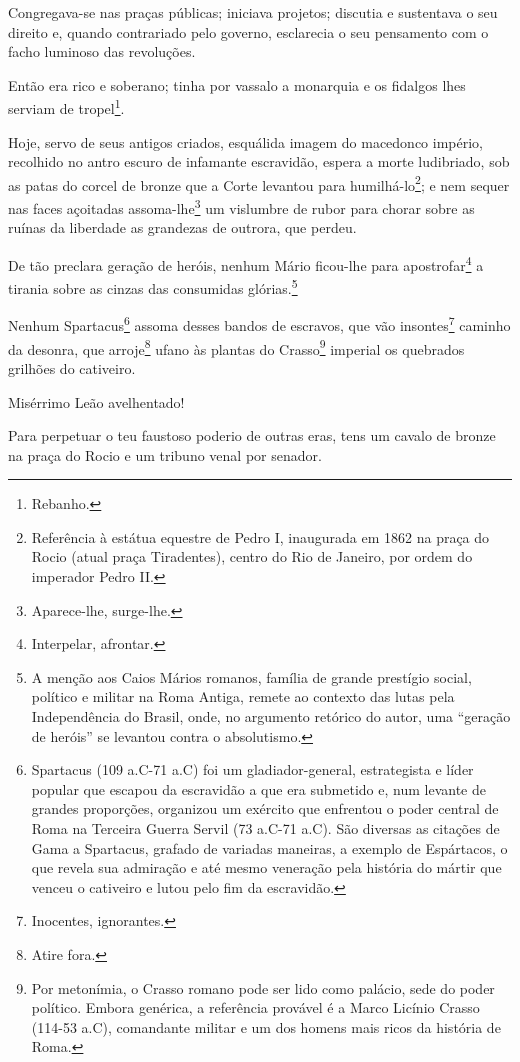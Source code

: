 Congregava-se nas praças públicas; iniciava projetos; discutia e
sustentava o seu direito e, quando contrariado pelo governo, esclarecia
o seu pensamento com o facho luminoso das revoluções.

Então era rico e soberano; tinha por vassalo a monarquia e os fidalgos
lhes serviam de tropel\footnote{Rebanho.}.

Hoje, servo de seus antigos criados, esquálida imagem do macedonco
império, recolhido no antro escuro de infamante escravidão, espera a
morte ludibriado, sob as patas do corcel de bronze que a Corte levantou
para humilhá-lo\footnote{Referência à estátua equestre de Pedro I,
  inaugurada em 1862 na praça do Rocio (atual praça Tiradentes), centro
  do Rio de Janeiro, por ordem do imperador Pedro II.}; e nem sequer nas
faces açoitadas assoma-lhe\footnote{Aparece-lhe, surge-lhe.} um
vislumbre de rubor para chorar sobre as ruínas da liberdade as grandezas
de outrora, que perdeu.

De tão preclara geração de heróis, nenhum Mário ficou-lhe para
apostrofar\footnote{Interpelar, afrontar.} a tirania sobre as cinzas
das consumidas glórias.\footnote{A menção aos Caios Mários romanos,
  família de grande prestígio social, político e militar na Roma Antiga,
  remete ao contexto das lutas pela Independência do Brasil, onde, no
  argumento retórico do autor, uma ``geração de heróis'' se levantou
  contra o absolutismo.}

Nenhum Spartacus\footnote{Spartacus (109 a.C-71 a.C) foi um
  gladiador-general, estrategista e líder popular que escapou da
  escravidão a que era submetido e, num levante de grandes proporções,
  organizou um exército que enfrentou o poder central de Roma na
  Terceira Guerra Servil (73 a.C-71 a.C). São diversas as citações de
  Gama a Spartacus, grafado de variadas maneiras, a exemplo de
  Espártacos, o que revela sua admiração e até mesmo veneração pela
  história do mártir que venceu o cativeiro e lutou pelo fim da
  escravidão.} assoma desses bandos de escravos, que vão
insontes\footnote{Inocentes, ignorantes.} caminho da desonra, que
arroje\footnote{Atire fora.} ufano às plantas do Crasso\footnote{Por
  metonímia, o Crasso romano pode ser lido como palácio, sede do poder
  político. Embora genérica, a referência provável é a Marco Licínio
  Crasso (114-53 a.C), comandante militar e um dos homens mais ricos da
  história de Roma.} imperial os quebrados grilhões do cativeiro.

Misérrimo Leão avelhentado!

Para perpetuar o teu faustoso poderio de outras eras, tens um cavalo de
bronze na praça do Rocio e um tribuno venal por senador.

